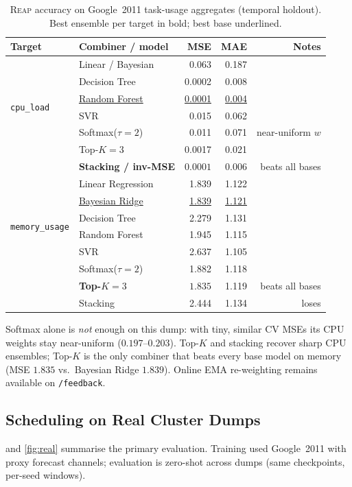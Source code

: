 \documentclass[runningheads]{llncs}
\newcommand{\reap}{\textsc{Reap}}
\begin{document}
\begin{table}[!htbp]
\centering
\caption{\reap{} accuracy on Google~2011 task-usage aggregates
(temporal holdout). Best ensemble per target in bold; best base
underlined.}
\label{tab:reap}
\footnotesize
\setlength{\tabcolsep}{3.5pt}
\begin{tabular}{l l r r r}
\toprule
Target & Combiner / model & MSE & MAE & Notes \\
\midrule
\multirow{6}{*}{\texttt{cpu\_load}}
 & Linear / Bayesian & 0.063 & 0.187 & \\
 & Decision Tree & 0.0002 & 0.008 & \\
 & \underline{Random Forest} & \underline{0.0001} & \underline{0.004} & \\
 & SVR & 0.015 & 0.062 & \\
 & Softmax($\tau{=}2$) & 0.011 & 0.071 & near-uniform $w$ \\
 & Top-$K{=}3$ & 0.0017 & 0.021 & \\
 & \textbf{Stacking / inv-MSE} & $\mathbf{0.0001}$ & $\mathbf{0.006}$ & beats all bases \\
\midrule
\multirow{6}{*}{\texttt{memory\_usage}}
 & Linear Regression & 1.839 & 1.122 & \\
 & \underline{Bayesian Ridge} & \underline{1.839} & \underline{1.121} & \\
 & Decision Tree & 2.279 & 1.131 & \\
 & Random Forest & 1.945 & 1.115 & \\
 & SVR & 2.637 & 1.105 & \\
 & Softmax($\tau{=}2$) & 1.882 & 1.118 & \\
 & \textbf{Top-$K{=}3$} & $\mathbf{1.835}$ & 1.119 & beats all bases \\
 & Stacking & 2.444 & 1.134 & loses \\
\bottomrule
\end{tabular}
\end{table}

Softmax alone is \emph{not} enough on this dump: with tiny, similar
CV MSEs its CPU weights stay near-uniform ($0.197$--$0.203$). Top-$K$
and stacking recover sharp CPU ensembles; Top-$K$ is the only combiner
that beats every base model on memory (MSE $1.835$ vs.\ Bayesian Ridge
$1.839$). Online EMA re-weighting remains available on
\texttt{/feedback}.

\subsection{Scheduling on Real Cluster Dumps}\label{sec:real}
 and \cref{fig:real} summarise the primary evaluation.
Training used Google~2011 with proxy forecast channels; evaluation is
zero-shot across dumps (same checkpoints, per-seed windows).
\end{document}
